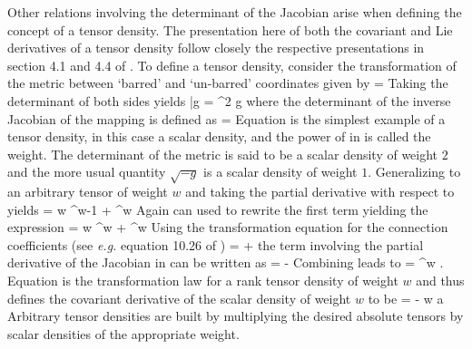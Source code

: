 \documentclass[12pt]{article}
\begin{document}
Other relations involving the determinant of the Jacobian arise when defining the
concept of a tensor density.
The presentation here of both the covariant and Lie derivatives of a tensor density follow
closely the respective presentations in section 4.1 and 4.4 of .
To define a tensor density, consider the transformation of the metric between `barred'
and `un-barred' coordinates given by
\be
 \met{\gbm \gbn} \nudge = \nudge \jac{\gbm}{\ga} \jac{\gbn}{\gb} \met{\ga \gb} \eqp
\ee
Taking the determinant of both sides yields
\be\label{eq:D8}
  {\bar g} = \mJ^2 g \eqp
\ee
where the determinant of the inverse Jacobian of the mapping \mJ \nudge is defined as
\be
  \mJ =  \eqp
\ee
Equation  is the simplest example of a tensor density, in this case a scalar
density, and the power of \mJ \nudge in  is called the weight.
The determinant of the metric is said to be a scalar density
of weight $2$ and the more usual quantity $\sqrt{-g}$ is a scalar density of weight $1$.
Generalizing  to an arbitrary tensor  of
weight $w$ and taking the partial
derivative with respect to  yields
\be
   = w \mJ^{w-1} \pdxby{\mJ}{\jac{\gbm}{\gn}}
                             + \mJ^w   \eqp
\ee
Again  can used to rewrite the first term yielding the expression
\be\label{eq:D9}
   = w \mJ^w \jac{\gn}{\gbm} \idx{\jac{\gbm}{\gn}}{\dn{,\gba}}
                             + \mJ^w   \eqp
\ee
Using the transformation equation for the connection coefficients (see \textit{e.g.}
equation 10.26 of )
\bes
\Cnx{\gbr}{\gba\gbt} = \Jac{\gm}{\gba} \Jac{\gn}{\gbt} \Jac{\gbr}{\gs} \Cnx{\gs}{\gm\gn}
                         +  \Jac{\gbr}{\gn} \eqc
\ees
the term involving the partial derivative of the Jacobian in  can be written
as
\bes
   \jac{\gn}{\gbm} \idx{\jac{\gbm}{\gn}}{\dn{,\gba}} =    \Cnx{\gbr}{\gbr\gba}
                                                       - \Jac{\gn}{\gba} \Cnx{\gs}{\gs \gn} \eqp
\ees
Combining leads to
\be\label{eq:D10}
 =
  \jac{\gba}{\gb} \mJ^w .
\ee
Equation  is the transformation law for a rank  tensor density
of weight $w$ and thus defines the covariant derivative of the scalar density of weight
$w$ to be
\be\label{eq:D11}
   =  - w \Cnx{\gs}{\gs \gb} a \eqp
\ee
Arbitrary tensor densities are built by multiplying the desired absolute tensors
by scalar densities of the appropriate weight.
\end{document}
